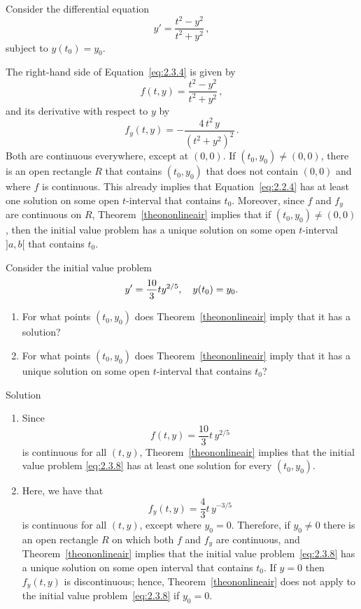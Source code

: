 \begin{example}\label{example:2.3.2}
Consider the differential equation
\begin{equation} \label{eq:2.3.4}
y'=\dfrac{t^2-y^2}{t^2+y^2}\,,
\end{equation}
subject to $y(t_0)=y_0$.

The right-hand side of Equation~\eqref{eq:2.3.4} is given by
$$
f(t,y)  =  \dfrac{t^2-y^2}{t^2+y^2}\,,
$$
and its derivative with respect to $y$ by
$$
f_y(t,y)  =  -\dfrac{4\,t^2\,y}{(t^2+y^2)^2}\,.
$$
Both are continuous everywhere, except at $(0,0)$. If $(t_0,y_0) \ne(0,0)$, there is  an open rectangle $R$ that contains
$(t_0,y_0)$ that does not contain $(0,0)$ and where $f$ is continuous. This already implies that Equation~\eqref{eq:2.2.4} has at least one solution on some open $t$-interval that contains $t_0$. Moreover, since $f$ and $f_y$ are continuous on $R$, Theorem~\ref{theononlineair} implies that if
$(t_0,y_0)\ne(0,0)$, then the initial value problem has a unique solution on some open $t$-interval $]a,b[$ that contains $t_0$.
\end{example}

\begin{example}\label{example:2.3.5}
\rm  Consider the initial value problem
\begin{equation} \label{eq:2.3.8}
y' = {10\over 3}ty^{2/5}, \quad y(t_0) = y_0.
\end{equation}
\begin{enumerate}
\item For what points $(t_0,y_0)$ does Theorem~\ref{theononlineair} imply that it has a solution?
\item For what points $(t_0,y_0)$ does Theorem~\ref{theononlineair} imply that it has a unique solution on some open $t$-interval that contains $t_0$?
\end{enumerate}

Solution 

\begin{enumerate}
\item Since
$$
f(t,y) = \dfrac{10}{ 3}t\,y^{2/5}
$$
is continuous for all $(t,y)$,  Theorem~\ref{theononlineair} implies that the initial value problem \eqref{eq:2.3.8} has at least one solution for every $(t_0,y_0)$.

\item Here, we have that
$$
f_y(t,y) = \dfrac{4}{3}t\,y^{-3/5}
$$
is continuous for all $(t,y)$, except where $y_0=0$. Therefore, if $y_0\ne0$ there is an open rectangle $R$ on which both $f$ and $f_y$ are continuous, and Theorem~\ref{theononlineair} implies that the initial value problem~\eqref{eq:2.3.8} has
a unique solution on some open interval that contains $t_0$. If $y=0$ then $f_y(t,y)$ is discontinuous;
hence, Theorem~\ref{theononlineair} does not apply to the initial value problem~\eqref{eq:2.3.8} if $y_0=0$.
\end{enumerate}
\end{example}


